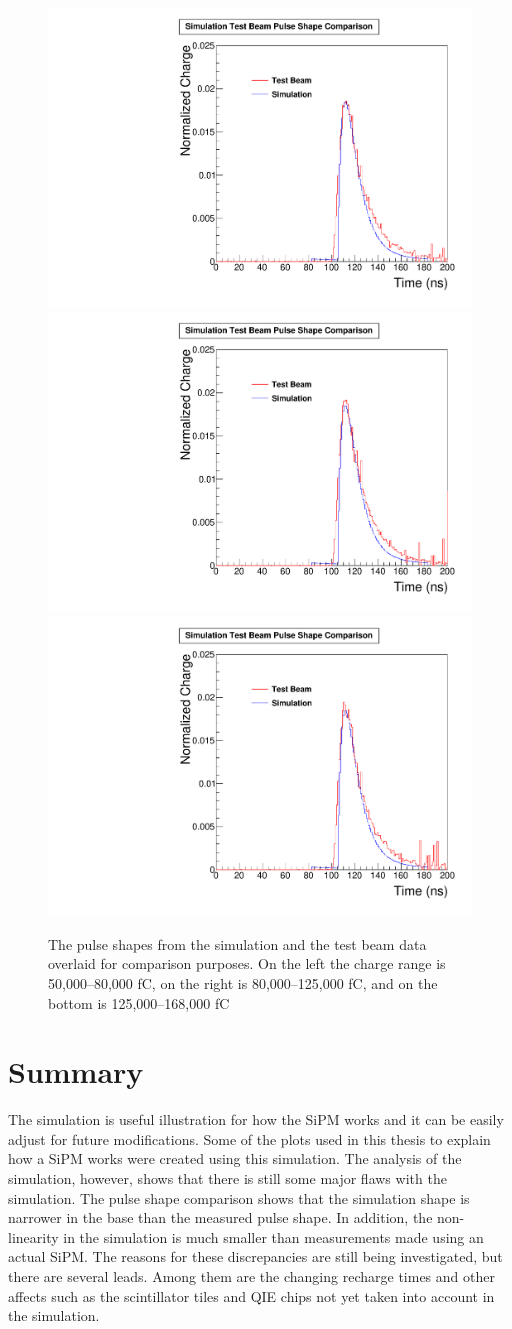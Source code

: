 \begin{figure}
\centering
\includegraphics[width=0.495\linewidth]{Figures/50Comparison.pdf}
\includegraphics[width=0.495\linewidth]{Figures/80Comparison.pdf}
\includegraphics[width=0.495\linewidth]{Figures/125Comparison.pdf}
\caption{The pulse shapes from the simulation and the test beam data overlaid for comparison purposes. On the left the charge range is 50,000--80,000 fC, on the right is 80,000--125,000 fC, and on the bottom is 125,000--168,000 fC}
\label{fig:2comparison_together}
\end{figure}

\section{Summary}

The simulation is useful illustration for how the SiPM works and it can be easily adjust for future modifications. Some of the plots used in this thesis to explain how a SiPM works were created using this simulation. The analysis of the simulation, however, shows that there is still some major flaws with the simulation. The pulse shape comparison shows that the simulation shape is narrower in the base than the measured pulse shape. In addition, the non-linearity in the simulation is much smaller than measurements made using an actual SiPM. The reasons for these discrepancies are still being investigated, but there are several leads. Among them are the changing recharge times and other affects such as the scintillator tiles and QIE chips not yet taken into account in the simulation. 